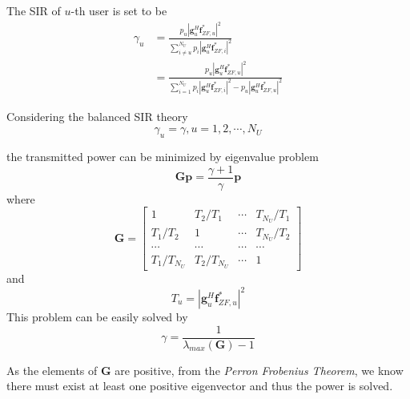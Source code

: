 \documentclass[conference]{IEEEtran}
\begin{document}
The SIR of $u$-th user is set to be 
\begin{align}
	\gamma_u &= \frac{p_u|\bm{g}_u^H\bm{f}^*_{ZF,u}|^2}{\sum_{i\neq u}^{N_U}p_i|\bm{g}_u^H \bm{f}^*_{ZF,i}|^2} \nonumber\\
		     &= \frac{p_u|\bm{g}_u^H\bm{f}^*_{ZF,u}|^2}{\sum_{i=1}^{N_U}p_i|\bm{g}_u^H \bm{f}^*_{ZF,i}|^2 - p_u|\bm{g}_u^H \bm{f}^*_{ZF,u}|^2}
\end{align}

Considering the balanced SIR theory 
\begin{equation}
\gamma_u=\gamma, u=1,2,\cdots,N_U
\end{equation}

the transmitted power can be minimized by eigenvalue problem
\begin{equation}
	\bm{Gp} = \frac{\gamma+1}{\gamma} \bm{p}
\end{equation}
where 
\begin{equation}
\bm{G}=
\begin{bmatrix}
1&T_2/T_1&\cdots&T_{N_U}/T_1\\
T_1/T_2&1&\cdots&T_{N_U}/T_2\\
\cdots&\cdots&\cdots&\cdots\\
T_1/T_{N_U}&T_2/T_{N_U}&\cdots&1
\end{bmatrix}
\end{equation}
and
\begin{equation}
T_u = |\bm{g}_u^H \bm{f}^*_{ZF,u}|^2
\end{equation}
This problem can be easily solved by 
\begin{equation}
	\gamma = \frac{1}{\lambda_{max}(\bm{G})-1}
\end{equation}

As the elements of $\bm{G}$ are positive, from the \textit{Perron Frobenius Theorem}, we know there must exist at least one positive eigenvector and thus the power is solved.
\end{document}
